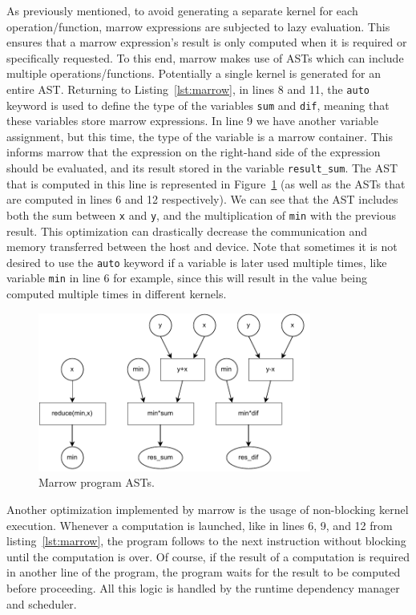 As previously mentioned, to avoid generating a separate kernel for each operation/function, marrow expressions are subjected to lazy evaluation. This ensures that a marrow expression's result is only computed when it is required or specifically requested. To this end, marrow makes use of \gls{AST}s which can include multiple operations/functions. Potentially a single kernel is generated for an entire \gls{AST}. Returning to Listing~\ref{lst:marrow}, in lines 8 and 11, the \texttt{auto} keyword is used to define the type of the variables \texttt{sum} and \texttt{dif}, meaning that these variables store marrow expressions. In line 9 we have another variable assignment, but this time, the type of the variable is a marrow container. This informs marrow that the expression on the right-hand side of the expression should be evaluated, and its result stored in the variable \texttt{result\_sum}. The \gls{AST} that is computed in this line is represented in Figure~\ref{fig:ast} (as well as the \gls{AST}s that are computed in lines 6 and 12 respectively). We can see that the \gls{AST} includes both the sum between \texttt{x} and \texttt{y}, and the multiplication of \texttt{min} with the previous result. This optimization can drastically decrease the communication and memory transferred between the host and device. Note that sometimes it is not desired to use the \texttt{auto} keyword if a variable is later used multiple times, like variable \texttt{min} in line 6 for example, since this will result in the value being computed multiple times in different kernels.

\begin{figure}[tbp]
  \centering
\includegraphics[width=0.8\textwidth]{Chapters/Figures/Images/ast.pdf}
    \caption{Marrow program \gls{AST}s.}
\label{fig:ast}
\end{figure}

Another optimization implemented by marrow is the usage of non-blocking kernel execution. Whenever a computation is launched, like in lines 6, 9, and 12 from listing~\ref{lst:marrow}, the program follows to the next instruction without blocking until the computation is over. Of course, if the result of a computation is required in another line of the program, the program waits for the result to be computed before proceeding. All this logic is handled by the runtime dependency manager and scheduler.




